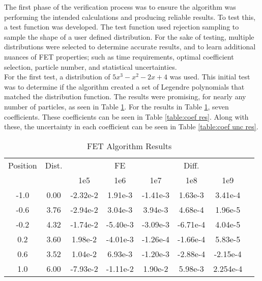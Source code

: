\documentclass[10tma4paper]{article}
\begin{document}
The first phase of the verification process was to ensure the algorithm was performing the intended calculations and producing reliable results. To test this, a test function was developed. The test function used rejection sampling to sample the shape of a user defined distribution. For the sake of testing, multiple distributions were selected to determine accurate results, and to learn additional nuances of FET properties; such as time requirements, optimal coefficient selection, particle number, and statistical uncertainties.
\\
For the first test, a distribution of $5x^{3}-x^{2}-2x+4$ was used. This initial test was to determine if the algorithm created a set of Legendre polynomials that matched the distribution function. The results were promising, for nearly any number of particles, as seen in Table \ref{table:alg res}. For the results in Table \ref{table:alg res}, seven coefficients. These coefficients can be seen in Table \ref{table:coef res}. Along with these, the uncertainty in each coefficient can be seen in Table \ref{table:coef unc res}.
\begin{table}[!htbp]
	\caption{FET Algorithm Results}
	\centering
	\begin{tabular}{c c c c c c c c}
		\hline
		Position & Dist. &  & FE &  & Diff. &  &\\[0.5ex]
		 & & 1e5 & 1e6 & 1e7 & 1e8 & 1e9 &\\
		 \hline
		 \hline
		-1.0 & 0.00 & -2.32e-2 & 1.91e-3  & -1.41e-3 & 1.63e-3  & 3.41e-4  & \\
		-0.6 & 3.76 & -2.94e-2 & 3.04e-3  & 3.94e-3  & 4.68e-4  & 1.96e-5  & \\
		-0.2 & 4.32 & -1.74e-2 & -5.40e-3 & -3.09e-3 & -6.71e-4 & 4.04e-5  & \\
		 0.2 & 3.60 & 1.98e-2  & -4.01e-3 & -1.26e-4 & -1.66e-4 & 5.83e-5  & \\
		 0.6 & 3.52 & 1.04e-2  & 6.93e-3  & -1.20e-3 & -2.88e-4 & -2.15e-4 & \\
		 1.0 & 6.00 & -7.93e-2 & -1.11e-2 & 1.90e-2  & 5.98e-3  & 2.254e-4 & \\ [1ex]
		\hline
	\end{tabular}
	\label{table:alg res}
\end{table}
\end{document}
